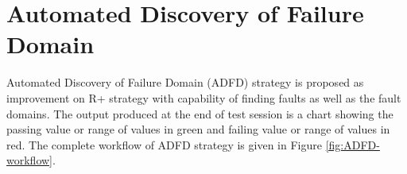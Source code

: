 

\section{Automated Discovery of Failure Domain}\label{sec:adfd}

Automated Discovery of Failure Domain (ADFD) strategy is proposed as improvement on R+ strategy with capability of finding faults as well as the fault domains. The output produced at the end of test session is a chart showing the passing value or range of values in green and failing value or range of values in red. The complete workflow of ADFD strategy is given in Figure \ref{fig:ADFD-workflow}.


